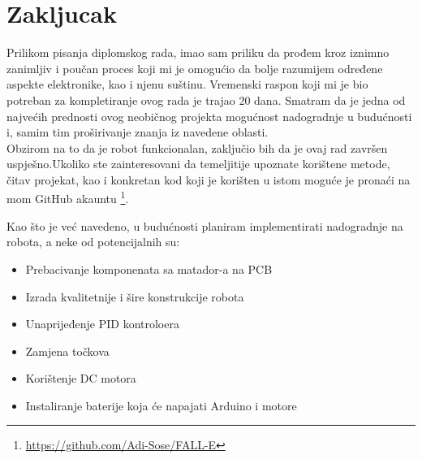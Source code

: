 \documentclass[../Document.tex]{subfiles}
\begin{document}
\section{Zakljucak}
Prilikom pisanja diplomskog rada, imao sam priliku da prođem kroz iznimno zanimljiv i poučan proces koji mi je omogućio da bolje razumijem određene aspekte elektronike, kao i njenu suštinu. Vremenski raspon koji mi je bio potreban za kompletiranje ovog rada je trajao 20 dana. Smatram da je jedna od najvećih prednosti ovog neobičnog projekta mogućnost nadogradnje u budućnosti i, samim tim proširivanje znanja iz navedene oblasti.\\

\noindent Obzirom na to da je robot funkcionalan, zaključio bih da je ovaj rad završen uspješno.Ukoliko ste zainteresovani da temeljitije upoznate korištene metode, čitav projekat, kao i konkretan kod koji je korišten u istom moguće je pronaći na mom GitHub akauntu \footnote{\url{https://github.com/Adi-Sose/FALL-E}}.

\noindent Kao što je već navedeno, u budućnosti planiram implementirati nadogradnje na robota, a neke od potencijalnih su:

\begin{itemize}
    \item Prebacivanje komponenata sa matador-a na PCB
    \item Izrada kvalitetnije i šire konstrukcije robota
    \item Unaprijeđenje PID kontroloera
    \item Zamjena točkova
    \item Korištenje DC motora
    \item Instaliranje baterije koja će napajati Arduino i motore
\end{itemize}
\end{document}
